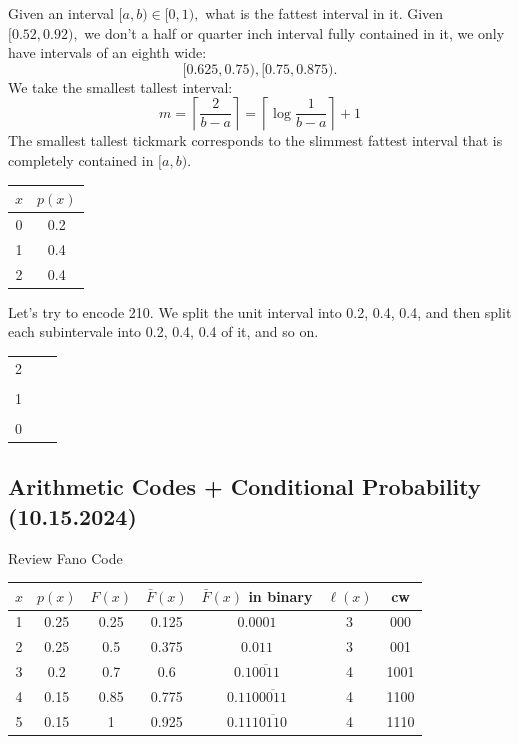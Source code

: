 \documentclass[12pt]{article}
\begin{document}
Given an interval $[a,b)\in[0,1),$ what is the fattest interval in it. Given $[0.52,0.92),$ we don't a half or quarter inch interval fully contained in it, we only have intervals of an eighth wide:
\[[0.625,0.75),[0.75,0.875).\]
We take the smallest tallest interval:
\[m=\left\lceil\frac{2}{b-a}\right\rceil=\left\lceil\log\frac{1}{b-a}\right\rceil+1\]
The smallest tallest tickmark corresponds to the slimmest fattest interval that is completely contained in $[a,b).$


\begin{tabular}{c|c}
     $x$&$p(x)$  \\
     \hline
     0&0.2\\1&0.4\\2&0.4 
\end{tabular}
Let's try to encode 210. We split the unit interval into 0.2, 0.4, 0.4, and then split each subintervale into 0.2, 0.4, 0.4 of it, and so on.


\begin{tabular}{c|c|c}
     2 &  &\\
     &  &\\
     \hline
     1& & \\
     & & \\
     \hline
     0 & & 
\end{tabular}



\subsection{Arithmetic Codes + Conditional Probability (10.15.2024)}
Review Fano Code

\begin{tabular}{c|c|c|c|c|c|c}
$x$&$p(x)$&$F(x)$&$\bar{F}(x)$&$\bar{F}(x)$ in binary&$\ell(x)$&cw\\
\hline
1&0.25&0.25&0.125&$0.0001$&3&000\\
2&0.25&0.5&0.375&$0.011$&3&001\\
3&0.2&0.7&0.6&$0.1\overline{0011}$&4&1001\\
4&0.15&0.85&0.775&$0.110\overline{0011}$&4&1100\\
5&0.15&1&0.925&$0.111\overline{0110}$&4&1110\\
\end{tabular}
\end{document}
